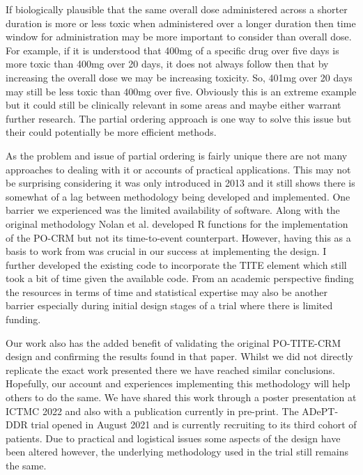 If biologically plausible that the same overall dose administered across a shorter duration is more or less toxic when administered over a longer duration then time window for administration may be more important to consider than overall dose. For example, if it is understood that 400mg of a specific drug over five days is more toxic than 400mg over 20 days, it does not always follow then that by increasing the overall dose we may be increasing toxicity. So, 401mg over 20 days may still be less toxic than 400mg over five. Obviously this is an extreme example but it could still be clinically relevant in some areas and maybe either warrant further research. The partial ordering approach is one way to solve this issue but their could potentially be more efficient methods.  

As the problem and issue of partial ordering is fairly unique there are not many approaches to dealing with it or accounts of practical applications. This may not be surprising considering it was only introduced in 2013 and it still shows there is somewhat of a lag between methodology being developed and implemented. One barrier we experienced was the limited availability of software. Along with the original methodology Nolan et al. \cite{wagesPocrmRpackagePhase2013, wagesPocrmDoseFinding2019} developed R functions for the implementation of the PO-CRM but not its time-to-event counterpart. However, having this as a basis to work from was crucial in our success at implementing the design. I further developed the existing code to incorporate the TITE element which still took a bit of time given the available code. From an academic perspective finding the resources in terms of time and statistical expertise may also be another barrier especially during initial design stages of a trial where there is limited funding. 

Our work also has the added benefit of validating the original PO-TITE-CRM design and confirming the results found in that paper. Whilst we did not directly replicate the exact work presented there we have reached similar conclusions. Hopefully, our account and experiences implementing this methodology will help others to do the same. We have shared this work through a poster presentation at ICTMC 2022 \cite{ICTMC20226th} and also with a publication currently in pre-print. The ADePT-DDR trial opened in August 2021 and is currently recruiting to its third cohort of patients. Due to practical and logistical issues some aspects of the design have been altered however, the underlying methodology used in the trial still remains the same. 

